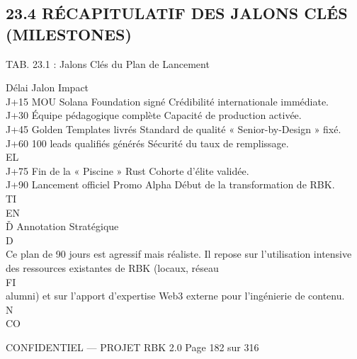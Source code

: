 \subsection{23.4 RÉCAPITULATIF DES JALONS CLÉS (MILESTONES)}
\vspace{0.5em}
\begin{center}\begin{tabular}TAB. 23.1 : Jalons Clés du Plan de Lancement\end{tabular}\end{center}
\vspace{0.5em}
\vspace{0.5em}
Délai Jalon                         Impact\\
J+15 MOU Solana Foundation signé Crédibilité internationale immédiate.\\
J+30 Équipe pédagogique complète Capacité de production activée.\\
J+45 Golden Templates livrés        Standard de qualité « Senior-by-Design » fixé.\\
J+60 100 leads qualifiés générés    Sécurité du taux de remplissage.\\
\vspace{0.5em}
\vspace{0.5em}
\vspace{0.5em}
\vspace{0.5em}
EL\\
J+75 Fin de la « Piscine » Rust     Cohorte d’élite validée.\\
J+90 Lancement officiel Promo Alpha Début de la transformation de RBK.\\
\vspace{0.5em}
\vspace{0.5em}
\vspace{0.5em}
\vspace{0.5em}
TI\\
EN\\
Ď Annotation Stratégique\\
\vspace{0.5em}
\vspace{0.5em}
\vspace{0.5em}
D\\
Ce plan de 90 jours est agressif mais réaliste. Il repose sur l’utilisation intensive des ressources existantes de RBK (locaux, réseau\\
\vspace{0.5em}
\vspace{0.5em}
\vspace{0.5em}
\vspace{0.5em}
FI\\
alumni) et sur l’apport d’expertise Web3 externe pour l’ingénierie de contenu.\\
\vspace{0.5em}
N\\
CO\\
\vspace{0.5em}
\vspace{0.5em}
\vspace{0.5em}
\vspace{0.5em}
\begin{confidential}CONFIDENTIEL — PROJET RBK 2.0                                 Page 182 sur 316\end{confidential}
